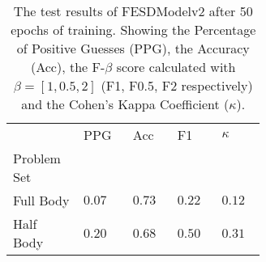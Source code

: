     \begin{table}[!htbp]
        \caption[Test Results of FESDModelv2]{The test results of FESDModelv2 after 50 epochs of training. Showing the Percentage of Positive Guesses (PPG), the Accuracy (Acc), the F-$\beta$ score calculated with $\beta = [1, 0.5, 2]$ (F1, F0.5, F2 respectively) and the Cohen's Kappa Coefficient ($\kappa$).}
        \label{tab:res_v2}
        \centering
        \begin{tabular}{p{0.14\linewidth}p{0.12\linewidth}p{0.12\linewidth}p{0.12\linewidth}p{0.12\linewidth}}
\hline
{} &    PPG &  Acc &   F1 &  $\kappa$ \\
Problem Set   &        &       &      &           \\
\hline
Full Body   & $0.07$ &	$0.73$ &	$0.22$ &	$0.12$ \\
Half Body   & $0.20$ &	$0.68$ &	$0.50$ &	$0.31$ \\
\hline
\end{tabular}

    \end{table}
